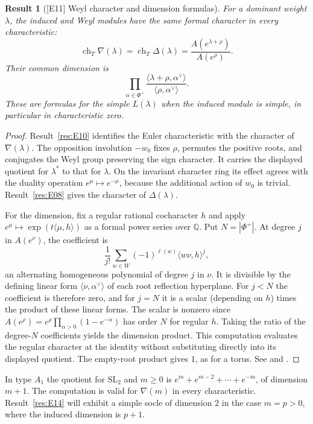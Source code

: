 \documentclass[11pt,a4paper,openany,oneside]{book}
\theoremstyle{resultstyle}
\newtheorem{statement}{Result}[chapter]
\newenvironment{result}[2]{\clubpenalty=10000\begin{statement}[\textnormal{[#1]} #2]\leavevmode\label{res:#1}\ignorespaces}{\end{statement}}
\theoremstyle{definition}
\numberwithin{equation}{chapter}
\begin{document}
\begin{result}{E11}{Weyl character and dimension formulas}
For a dominant weight \(\lambda\), the induced and Weyl modules have the same formal character in every characteristic:
\[
 \operatorname{ch}_T\nabla(\lambda)
 =\operatorname{ch}_T\Delta(\lambda)
 =\frac{A(e^{\lambda+\rho})}{A(e^\rho)}.
\]
Their common dimension is
\[
 \prod_{\alpha\in\Phi^+}
 \frac{\langle\lambda+\rho,\alpha^\vee\rangle}
      {\langle\rho,\alpha^\vee\rangle}.
\]
These are formulas for the simple \(L(\lambda)\) when the induced module is simple, in particular in characteristic zero.
\end{result}
\begin{proof}
Result~\ref{res:E10} identifies the Euler characteristic with the character of \(\nabla(\lambda)\). The opposition involution \(-w_0\) fixes \(\rho\), permutes the positive roots, and conjugates the Weyl group preserving the sign character. It carries the displayed quotient for \(\lambda^*\) to that for \(\lambda\). On the invariant character ring its effect agrees with the duality operation \(e^\mu\mapsto e^{-\mu}\), because the additional action of \(w_0\) is trivial. Result~\ref{res:E08} gives the character of \(\Delta(\lambda)\).

For the dimension, fix a regular rational cocharacter \(h\) and apply \(e^\mu\mapsto\exp(t\langle\mu,h\rangle)\) as a formal power series over \(\mathbb Q\). Put \(N=|\Phi^+|\). At degree \(j\) in \(A(e^\nu)\), the coefficient is
\[
 \frac1{j!}\sum_{w\in W}(-1)^{\ell(w)}\langle w\nu,h\rangle^j ,
\]
an alternating homogeneous polynomial of degree \(j\) in \(\nu\). It is divisible by the defining linear form \(\langle\nu,\alpha^\vee\rangle\) of each root reflection hyperplane. For \(j<N\) the coefficient is therefore zero, and for \(j=N\) it is a scalar (depending on \(h\)) times the product of these linear forms. The scalar is nonzero since \(A(e^\rho)=e^\rho\prod_{\alpha>0}(1-e^{-\alpha})\) has order \(N\) for regular \(h\). Taking the ratio of the degree-\(N\) coefficients yields the dimension product. This computation evaluates the regular character at the identity without substituting directly into its displayed quotient. The empty-root product gives \(1\), as for a torus. See \cite[22.50--22.52]{milne} and \cite[Part~II, Chapter~5]{jantzen}.
\end{proof}

In type \(A_1\) the quotient for \(\mathrm{SL}_2\) and \(m\geq0\) is
\(e^m+e^{m-2}+\cdots+e^{-m}\), of dimension \(m+1\). The computation is valid for \(\nabla(m)\) in every characteristic. Result~\ref{res:E14} will exhibit a simple socle of dimension \(2\) in the case \(m=p>0\), where the induced dimension is \(p+1\).
\end{document}
